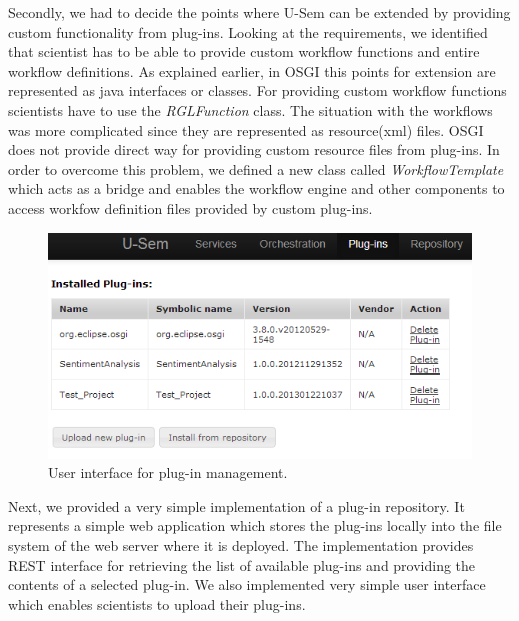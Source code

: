 Secondly, we had to decide the points where U-Sem can be extended by providing custom functionality from plug-ins. Looking at the requirements, we identified that scientist has to be able to provide custom workflow functions and entire workflow definitions. As explained earlier, in OSGI this points for extension are represented as java interfaces or classes. For providing custom workflow functions scientists have to use the \textit{RGLFunction} class. The situation with the workflows was more complicated since they are represented as resource(xml) files. OSGI does not provide direct way for providing custom resource files from plug-ins. In order to overcome this problem, we defined a new class called \textit{WorkflowTemplate} which acts as a bridge and enables the workflow engine and other components to access workfow definition files provided by custom plug-ins.

\begin{figure}[h!]
  \centering
  	\includegraphics[scale=0.70]{plug-in/ui/list.png}
  \caption{User interface for plug-in management.}
  \label{list_ui}
\end{figure}

Next, we provided a very simple implementation of a plug-in repository. It represents a simple web application which stores the plug-ins locally into the file system of the web server where it is deployed. The implementation provides REST interface for retrieving the list of available plug-ins and providing the contents of a selected plug-in. We also implemented very simple user interface which enables scientists to upload their plug-ins. 


